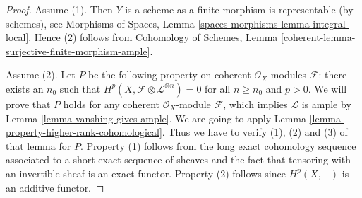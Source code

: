 \begin{proof}
Assume (1). Then $Y$ is a scheme as a finite morphism is representable
(by schemes), see Morphisms of Spaces, Lemma
\ref{spaces-morphisms-lemma-integral-local}. Hence (2)
follows from Cohomology of Schemes, Lemma
\ref{coherent-lemma-surjective-finite-morphism-ample}.

\medskip\noindent
Assume (2). Let $P$ be the following property on
coherent $\mathcal{O}_X$-modules $\mathcal{F}$: there exists an $n_0$
such that $H^p(X, \mathcal{F} \otimes \mathcal{L}^{\otimes n}) = 0$
for all $n \geq n_0$ and $p > 0$. We will prove that $P$ holds
for any coherent $\mathcal{O}_X$-module $\mathcal{F}$, which implies
$\mathcal{L}$ is ample by Lemma \ref{lemma-vanshing-gives-ample}.
We are going to apply Lemma \ref{lemma-property-higher-rank-cohomological}.
Thus we have to verify (1), (2) and (3) of that lemma for $P$.
Property (1) follows from the long exact cohomology sequence associated
to a short exact sequence of sheaves and the fact that tensoring with
an invertible sheaf is an exact functor. Property (2) follows since
$H^p(X, -)$ is an additive functor.


\end{proof}
